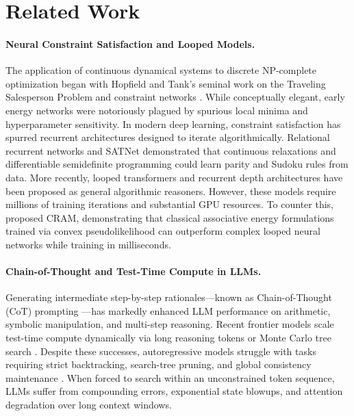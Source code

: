 \documentclass{article} %
\begin{document}
\section{Related Work}
\label{sec:related_work}

\paragraph{Neural Constraint Satisfaction and Looped Models.}
The application of continuous dynamical systems to discrete NP-complete optimization began with Hopfield and Tank's seminal work on the Traveling Salesperson Problem and constraint networks \citep{hopfield1985neural}. While conceptually elegant, early energy networks were notoriously plagued by spurious local minima and hyperparameter sensitivity. In modern deep learning, constraint satisfaction has spurred recurrent architectures designed to iterate algorithmically. Relational recurrent networks \citep{palm2018recurrent} and SATNet \citep{wang2019satnet} demonstrated that continuous relaxations and differentiable semidefinite programming could learn parity and Sudoku rules from data. More recently, looped transformers and recurrent depth architectures \citep{schwarzschild2021can,bansal2022end,giannou2023looped} have been proposed as general algorithmic reasoners. However, these models require millions of training iterations and substantial GPU resources. To counter this, \citet{hoover2026classical} proposed CRAM, demonstrating that classical associative energy formulations trained via convex pseudolikelihood can outperform complex looped neural networks while training in milliseconds.

\paragraph{Chain-of-Thought and Test-Time Compute in LLMs.}
Generating intermediate step-by-step rationales---known as Chain-of-Thought (CoT) prompting \citep{wei2022chain,nye2021show}---has markedly enhanced LLM performance on arithmetic, symbolic manipulation, and multi-step reasoning. Recent frontier models scale test-time compute dynamically via long reasoning tokens or Monte Carlo tree search \citep{snell2024scaling,brown2024large}. Despite these successes, autoregressive models struggle with tasks requiring strict backtracking, search-tree pruning, and global consistency maintenance \citep{valmeekam2023planning,dziri2024faith}. When forced to search within an unconstrained token sequence, LLMs suffer from compounding errors, exponential state blowups, and attention degradation over long context windows.
\end{document}

